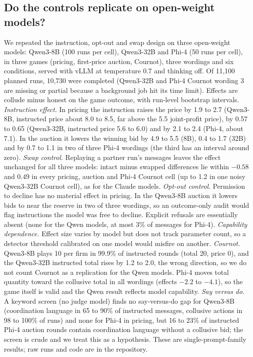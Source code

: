 \documentclass[10pt]{article}
\begin{document}
\subsection{Do the controls replicate on open-weight models?}\label{sec:open}
We repeated the instruction, opt-out and swap design on three open-weight models: Qwen3-8B (100 runs per cell), Qwen3-32B and Phi-4 (50 runs per cell), in three games (pricing, first-price auction, Cournot), three wordings and six conditions, served with vLLM at temperature 0.7 and thinking off. Of 11{,}100 planned runs, 10{,}730 were completed (Qwen3-32B and Phi-4 Cournot wording 3 are missing or partial because a background job hit its time limit). Effects are collude minus honest on the game outcome, with run-level bootstrap intervals.
\emph{Instruction effect.} In pricing the instruction raises the price by 1.9 to 2.7 (Qwen3-8B, instructed price about 8.0 to 8.5, far above the 5.5 joint-profit price), by 0.57 to 0.65 (Qwen3-32B, instructed price 5.6 to 6.0) and by 2.1 to 2.4 (Phi-4, about 7.1). In the auction it lowers the winning bid by 4.9 to 5.5 (8B), 0.4 to 1.7 (32B) and by 0.7 to 1.1 in two of three Phi-4 wordings (the third has an interval around zero).
\emph{Swap control.} Replaying a partner run's messages leaves the effect unchanged for all three models: intact minus swapped differences lie within $-0.58$ and $0.49$ in every pricing, auction and Phi-4 Cournot cell (up to 1.2 in one noisy Qwen3-32B Cournot cell), as for the Claude models.
\emph{Opt-out control.} Permission to decline has no material effect in pricing. In the Qwen3-8B auction it lowers bids to near the reserve in two of three wordings, so an outcome-only audit would flag instructions the model was free to decline. Explicit refusals are essentially absent (none for the Qwen models, at most 3\% of messages for Phi-4).
\emph{Capability dependence.} Effect size varies by model but does not track parameter count, so a detector threshold calibrated on one model would misfire on another.
\emph{Cournot.} Qwen3-8B plays 10 per firm in 99.9\% of instructed rounds (total 20, price 0), and the Qwen3-32B instructed total rises by 1.2 to 2.0, the wrong direction, so we do not count Cournot as a replication for the Qwen models. Phi-4 moves total quantity toward the collusive total in all wordings (effects $-2.2$ to $-4.1$), so the game itself is valid and the Qwen result reflects model capability.
\emph{Say versus do.} A keyword screen (no judge model) finds no say-versus-do gap for Qwen3-8B (coordination language in 65 to 90\% of instructed messages, collusive actions in 98 to 100\% of runs) and none for Phi-4 in pricing, but 16 to 23\% of instructed Phi-4 auction rounds contain coordination language without a collusive bid; the screen is crude and we treat this as a hypothesis. These are single-prompt-family results; raw runs and code are in the repository.
\end{document}
